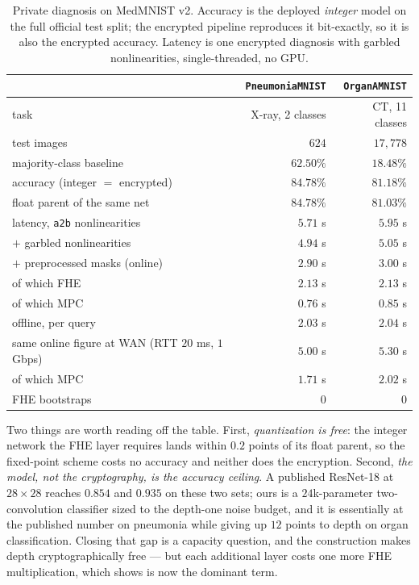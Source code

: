 \documentclass[11pt]{article}
\theoremstyle{plain}
\theoremstyle{definition}
\theoremstyle{remark}
\begin{document}
\begin{table}[t]
\centering
\caption{Private diagnosis on MedMNIST v2. Accuracy is the deployed
\emph{integer} model on the full official test split; the encrypted pipeline
reproduces it bit-exactly, so it is also the encrypted accuracy. Latency is
one encrypted diagnosis with garbled nonlinearities, single-threaded, no GPU.}
\label{tab:diagnosis}
\begin{tabular}{@{}lrr@{}}
\toprule
 & \texttt{PneumoniaMNIST} & \texttt{OrganAMNIST} \\
\midrule
task & X-ray, 2 classes & CT, 11 classes \\
test images & $624$ & $17{,}778$ \\
majority-class baseline & $62.50\%$ & $18.48\%$ \\
accuracy (integer $=$ encrypted) & $\mathbf{84.78\%}$ & $\mathbf{81.18\%}$ \\
float parent of the same net & $84.78\%$ & $81.03\%$ \\
\midrule
latency, \texttt{a2b} nonlinearities & $5.71$ s & $5.95$ s \\
$+$ garbled nonlinearities & $4.94$ s & $5.05$ s \\
$+$ preprocessed masks (online) & $\mathbf{2.90}$ s & $\mathbf{3.00}$ s \\
\quad of which FHE & $2.13$ s & $2.13$ s \\
\quad of which MPC & $0.76$ s & $0.85$ s \\
offline, per query & $2.03$ s & $2.04$ s \\
\midrule
same online figure at WAN (RTT $20$ ms, $1$ Gbps) & $5.00$ s & $5.30$ s \\
\quad of which MPC & $1.71$ s & $2.02$ s \\
\midrule
FHE bootstraps & $0$ & $0$ \\
\bottomrule
\end{tabular}
\end{table}

Two things are worth reading off the table. First, \emph{quantization is
free}: the integer network the FHE layer requires lands within $0.2$ points
of its float parent, so the fixed-point scheme costs no accuracy and neither
does the encryption. Second, \emph{the model, not the cryptography, is the
accuracy ceiling}. A published ResNet-18 at $28\times28$ reaches $0.854$ and
$0.935$ on these two sets; ours is a $24$k-parameter two-convolution
classifier sized to the depth-one noise budget, and it is essentially at the
published number on pneumonia while giving up $12$ points to depth on organ
classification. Closing that gap is a capacity question, and the construction
makes depth cryptographically free --- but each additional layer costs one
more FHE multiplication, which  shows is now the
dominant term.
\end{document}
